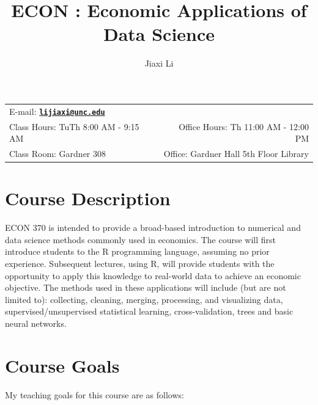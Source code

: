 \documentclass[11pt]{article}
\title{ECON \CourseNum: Economic Applications of Data Science} %
\author{Jiaxi Li}                                            %
\date{\SemSeason \SemYear}                                     %
\newcommand{\CourseNum}{370\xspace}         %
\begin{document}
\maketitle

\begin{tabular*}{\textwidth}{@{\extracolsep{\fill}}lr}

E-mail: \href{mailto:lijiaxi@unc.edu}{\tt\bf lijiaxi@unc.edu} \\

Class Hours: TuTh 8:00 AM - 9:15 AM & Office Hours: Th 11:00 AM - 12:00 PM \\

Class Room: Gardner 308 & Office: Gardner Hall 5th Floor Library \\
\hline
\end{tabular*}
\vspace{2 mm}

\section*{Course Description}
ECON \CourseNum is intended to provide a broad-based introduction to numerical and data science methods commonly used in economics. The course will first introduce students to the R programming language, assuming no prior experience. Subsequent lectures, using R, will provide students with the opportunity to apply this knowledge to real-world data to achieve an economic objective.  The methods used in these applications will include (but are not limited to): collecting, cleaning, merging, processing, and visualizing data, supervised/unsupervised statistical learning, cross-validation, trees and basic neural networks.

\section*{Course Goals}
My teaching goals for this course are as follows:
\end{document}
